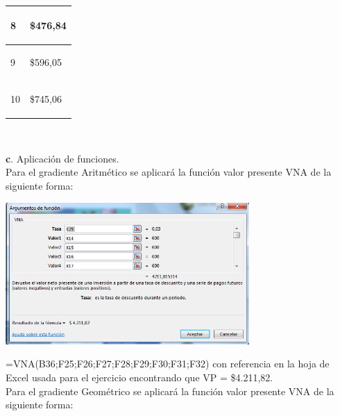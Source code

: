 \begin{spacing}{0.1}
\begin{center}
\begin{tabular}{ |p{3.5cm}| p{3cm}|}
\begin{center}8 \end{center}    & \begin{center} \$476,84 \end{center} \\ \hline

\begin{center}9 \end{center}    & \begin{center} \$596,05 \end{center} \\ \hline

\begin{center}10 \end{center}    & \begin{center} \$745,06 \end{center} \\ \hline

\end{tabular}
\end{center}
\end{spacing}
\\

\clearpage

\textbf{c}. Aplicación de funciones.
 \\
 
Para el gradiente Aritmético se aplicará la función  valor presente VNA de la siguiente forma:     
 
 \begin{center}
	\includegraphics[height=5.4cm]{img/ch8/8_19.png}
\end{center}

=VNA(B36;F25;F26;F27;F28;F29;F30;F31;F32) con referencia en la hoja de Excel usada para el ejercicio encontrando que VP = \$4.211,82.
\\ 
 
Para el gradiente Geométrico se aplicará la función  valor presente VNA de la siguiente forma:     
 
